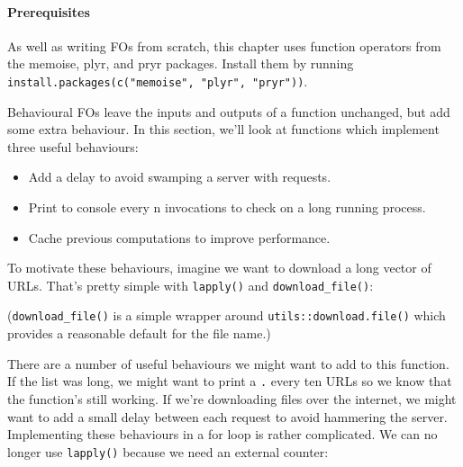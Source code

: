 \paragraph{Prerequisites}

As well as writing FOs from scratch, this chapter uses function
operators from the memoise, plyr, and pryr packages. Install them by
running \texttt{install.packages(c("memoise", "plyr", "pryr"))}.


Behavioural FOs leave the inputs and outputs of a function unchanged,
but add some extra behaviour. In this section, we'll look at functions
which implement three useful behaviours:

\begin{itemize}
\itemsep1pt\parskip0pt
\item
  Add a delay to avoid swamping a server with requests.
\item
  Print to console every n invocations to check on a long running
  process.
\item
  Cache previous computations to improve performance.
\end{itemize}

To motivate these behaviours, imagine we want to download a long vector
of URLs. That's pretty simple with \texttt{lapply()} and
\texttt{download\_file()}:

\begin{Shaded}
\begin{Highlighting}[]
\StringTok{ }
\NormalTok{\}}
\end{Highlighting}
\end{Shaded}

(\texttt{download\_file()} is a simple wrapper around
\texttt{utils::download.file()} which provides a reasonable default for
the file name.)

There are a number of useful behaviours we might want to add to this
function. If the list was long, we might want to print a \texttt{.}
every ten URLs so we know that the function's still working. If we're
downloading files over the internet, we might want to add a small delay
between each request to avoid hammering the server. Implementing these
behaviours in a for loop is rather complicated. We can no longer use
\texttt{lapply()} because we need an external counter:

